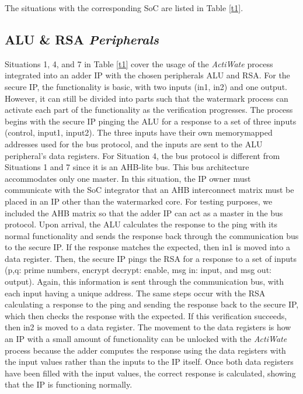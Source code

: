 \documentclass[onecolumn]{IEEEtran}
\begin{document}
The situations with the corresponding SoC are listed in Table \ref{t1}.
\subsection{ALU \& RSA \textit{Peripherals}} 
\label{sec4a}

Situations 1, 4, and 7 in Table \ref{t1} cover the usage of the \textit{ActiWate}
process integrated into an adder IP with the chosen peripherals ALU
and RSA. For the secure IP, the functionality is basic, with two
inputs (in1, in2) and one output. However, it can still be divided into
parts such that the watermark process can activate each part of the
functionality as the verification progresses. The process begins with
the secure IP pinging the ALU for a response to a set of three inputs
(control, input1, input2). The three inputs have their own memorymapped addresses used for the bus protocol, and the inputs are sent to
the ALU peripheral’s data registers. For Situation 4, the bus protocol
is different from Situations 1 and 7 since it is an AHB-lite bus. This
bus architecture accommodates only one master. In this situation,
the IP owner must communicate with the SoC integrator that an
AHB interconnect matrix must be placed in an IP other than the
watermarked core. For testing purposes, we included the AHB matrix
so that the adder IP can act as a master in the bus protocol.
Upon arrival, the ALU calculates the response to the ping with
its normal functionality and sends the response back through the
communication bus to the secure IP. If the response matches the
expected, then in1 is moved into a data register. Then, the secure IP
pings the RSA for a response to a set of inputs (p,q: prime numbers,
encrypt decrypt: enable, msg in: input, and msg out: output). Again,
this information is sent through the communication bus, with each
input having a unique address. The same steps occur with the RSA
calculating a response to the ping and sending the response back to
the secure IP, which then checks the response with the expected. If
this verification succeeds, then in2 is moved to a data register. The
movement to the data registers is how an IP with a small amount
of functionality can be unlocked with the \textit{ActiWate} process because
the adder computes the response using the data registers with the
input values rather than the inputs to the IP itself. Once both data
registers have been filled with the input values, the correct response
is calculated, showing that the IP is functioning normally.
\end{document}
